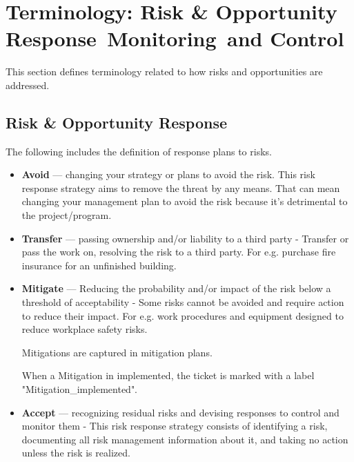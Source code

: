\section{Terminology: Risk \& Opportunity Response\, Monitoring\, and Control}

This section defines terminology related to how risks and opportunities are addressed.

\subsection{Risk \& Opportunity Response}
\label{sec:response-types}


The following includes the definition of response plans to risks.

\begin{itemize}
 	\item \textbf{Avoid} ---
 	changing your strategy or plans to avoid the risk. This risk response strategy aims to remove the threat by any means. That can mean changing your management plan to avoid the risk because it’s detrimental to the project/program.

	\item \textbf{Transfer} ---
 	passing ownership and/or liability to a third party - Transfer or pass the work on, resolving the risk to a third party. For e.g. purchase fire insurance for an unfinished building.

 	\item \textbf{Mitigate} ---
 	Reducing the probability and/or impact of the risk below a threshold of acceptability - Some risks cannot be avoided and require action to reduce their impact. For e.g. work procedures and equipment designed to reduce workplace safety risks.
    
    Mitigations are captured in mitigation plans.

    When a Mitigation in implemented, the ticket is marked with a label "Mitigation\_implemented".

 	\item \textbf{Accept} ---
 	recognizing residual risks and devising responses to control and monitor them - This risk response strategy consists of identifying a risk, documenting all risk management information about it, and taking no action unless the risk is realized.
 \end{itemize}

